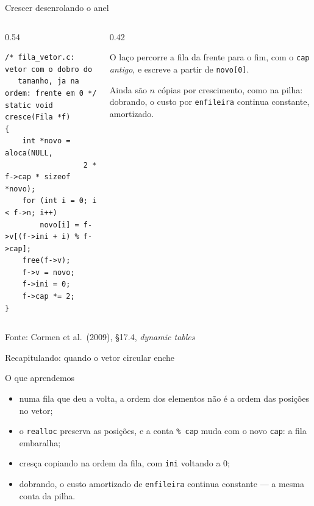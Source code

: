 \documentclass[aspectratio=169]{beamer}
\newcommand{\fonte}[1]{\vfill\hfill{\scriptsize\textcolor{UFSGray}{Fonte: #1}}}
\begin{document}
\begin{frame}[fragile]{Crescer desenrolando o anel}
  \begin{columns}[T]
    \begin{column}{0.54\textwidth}
\begin{lstlisting}[style=codC]
/* fila_vetor.c: vetor com o dobro do
   tamanho, ja na ordem: frente em 0 */
static void cresce(Fila *f)
{
    int *novo = aloca(NULL,
                  2 * f->cap * sizeof *novo);
    for (int i = 0; i < f->n; i++)
        novo[i] = f->v[(f->ini + i) % f->cap];
    free(f->v);
    f->v = novo;
    f->ini = 0;
    f->cap *= 2;
}
\end{lstlisting}
    \end{column}
    \begin{column}{0.42\textwidth}
      \begin{center}
      \end{center}
      \small O laço percorre a fila da frente para o fim, com o
      \texttt{cap} \emph{antigo}, e escreve a partir de \texttt{novo[0]}.

      \medskip
      Ainda são $n$ cópias por crescimento, como na pilha: dobrando, o custo
      por \texttt{enfileira} continua constante, amortizado.
    \end{column}
  \end{columns}
  \fonte{Cormen et al.\ (2009), §17.4, \emph{dynamic tables}~\cite{cormen2009introduction}}
\end{frame}

\begin{frame}{Recapitulando: quando o vetor circular enche}
  \begin{block}{O que aprendemos}
    \begin{itemize}
      \item numa fila que deu a volta, a ordem dos elementos não é a ordem
        das posições no vetor;
      \item o \texttt{realloc} preserva as posições, e a conta
        \texttt{\% cap} muda com o novo \texttt{cap}: a fila embaralha;
      \item cresça copiando na ordem da fila, com \texttt{ini} voltando a 0;
      \item dobrando, o custo amortizado de \texttt{enfileira} continua
        constante --- a mesma conta da pilha.
    \end{itemize}
  \end{block}
\end{frame}
\end{document}

